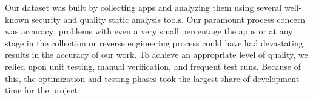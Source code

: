 \documentclass{sig-alternate-05-2015}
\begin{document}


Our dataset was built by collecting apps and analyzing them using several well-known security and quality static analysis tools. Our paramount process concern was accuracy; problems with even a very small percentage the apps or at any stage in the collection or reverse engineering process could have had devastating results in the accuracy of our work. To achieve an appropriate level of quality, we relied upon unit testing, manual verification, and frequent test runs. Because of this, the optimization and testing phases took the largest share of development time for the project.




%
%
%
%
%
%
%
%
\end{document}
